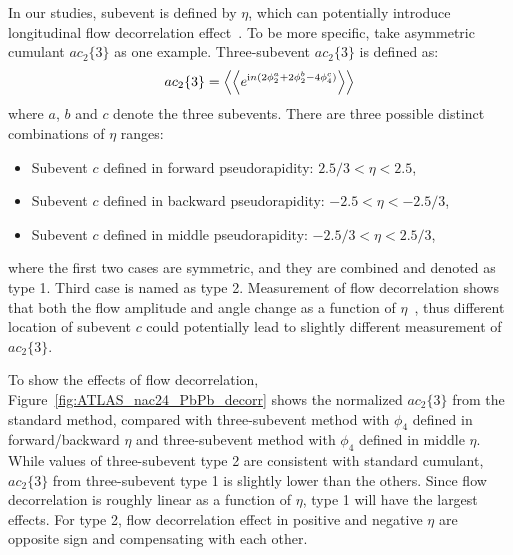 In our studies, subevent is defined by $\eta$, which can potentially introduce longitudinal flow decorrelation effect~\cite{Aaboud:2017tql}. To be more specific, take asymmetric cumulant $ac_2\{3\}$ as one example. Three-subevent $ac_2\{3\}$ is defined as:
\begin{equation}
ac_2\{3\} = \left\langle \left\langle e^{\text{i}n(2\phi_2^a + 2\phi_2^b - 4\phi_4^c)}\right\rangle\right\rangle
\end{equation}
where $a$, $b$ and $c$ denote the three subevents. There are three possible distinct combinations of $\eta$ ranges:
\begin{itemize}
\item Subevent $c$ defined in forward pseudorapidity: $2.5/3 < \eta < 2.5$,
\item Subevent $c$ defined in backward pseudorapidity: $-2.5 < \eta < -2.5/3$,
\item Subevent $c$ defined in middle pseudorapidity: $-2.5/3 < \eta < 2.5/3$,
\end{itemize}
where the first two cases are symmetric, and they are combined and denoted as type 1. Third case is named as type 2. Measurement of flow decorrelation shows that both the flow amplitude and angle change as a function of $\eta$~\cite{Aaboud:2017tql}, thus different location of subevent $c$ could potentially lead to slightly different measurement of $ac_2\{3\}$.

To show the effects of flow decorrelation, Figure~\ref{fig:ATLAS_nac24_PbPb_decorr} shows the normalized $ac_2\{3\}$ from the standard method, compared with three-subevent method with $\phi_4$ defined in forward/backward $\eta$ and three-subevent method with $\phi_4$ defined in middle $\eta$. While values of three-subevent type 2 are consistent with standard cumulant, $ac_2\{3\}$ from three-subevent type 1 is slightly lower than the others. Since flow decorrelation is roughly linear as a function of $\eta$, type 1 will have the largest effects. For type 2, flow decorrelation effect in positive and negative $\eta$ are opposite sign and compensating with each other.


